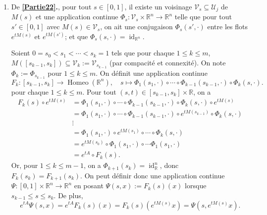 \documentclass[french]{article}
\theoremstyle{definition}
\newcommand{\Rbb}{\mathbb{R}}
\newcommand{\Ucal}{\mathcal{U}}
\newcommand{\Vcal}{\mathcal{V}}
\newcommand{\id}{\operatorname{id}}
\newcommand{\Homeo}{\operatorname{Homeo}}
\newcommand{\diag}{\operatorname{diag}}
\begin{document}
\begin{enumerate}
\begin{enumerate}
        \item De m\^eme, on peut trouver les chemins $c_k$ reliant $C_k$ \`a $\diag[-1,\ldots,-1]$ ($1 \le k \le u$) tel que les valeurs propres de $c_k(t)$ sont n\'egatives pour tout $t \in [0,1]$; et les chemins $d_k$ reliant $D_k$ \`a $\diag[-1,\ldots,-1]$ ($1 \le k \le v$) tel que les valeurs propres de $d_k(t)$ sont de partie r\'eelle n\'egative pour tout $t \in [0,1]$.
        \end{enumerate}
        
        Ainsi, on a un chemin
            $$h:=\diag[a_1,\ldots,a_r,b_1,\ldots,b_s,c_1,\ldots,c_u,d_1,\ldots,d_v] : [0,1] \to \Ucal_j$$
        reliant $h(0) = H$ \`a $h(1) = I_j$. En cons\'equence, on a une chemin
            $$\forall t \in [0,1], \qquad m(t):=p(t)h(t)p(t)^{-1} \in \Ucal_j$$
        reliant $m(0) = PHP^{-1} = M$ \`a $m(1) = I_j$ dans $\Ucal_j$. Donc $\Ucal_j$ est connexe par arcs.
        
        \item \label{Partie24} De {\bf \ref{Partie22}.}, pour tout $s \in [0,1]$, il existe un voisinage $\Vcal_s \subseteq \Ucal_j$ de $M(s)$ et une application continue $\Phi_s: \Vcal_s \times \Rbb^n \to \Rbb^n$ telle que pour tout $s' \in [0,1]$ avec $M(s) \in \Vcal_s$, on ait une conjugaison $\Phi_s(s',\cdot)$ entre les flots $e^{tM(s)}$ et $e^{tM(s')}$; et que $\Phi_s(s,\cdot) = \id_{\Rbb^n}$.
        
        Soient $0 = s_0 < s_1 < \cdots < s_k = 1$ tels que pour chaque $1 \le k \le m$, $M([s_{k-1},s_k]) \subseteq \Vcal_k:=\Vcal_{s_{k-1}}$ (par compacit\'e et connexit\'e). On note $\Phi_k:=\Phi_{s_{k-1}}$ pour $1 \le k \le m$. On d\'efinit une application continue 
            $$F_k: [s_{k-1},s_k] \to \Homeo(\Rbb^n), \quad s \mapsto \Phi_1(s_1,\cdot) \circ \cdots \circ \Phi_{k-1}(s_{k-1},\cdot) \circ  \Phi_k(s,\cdot).$$
        pour chaque $1 \le k \le m$. Pour tout $(s,t) \in [s_{k-1}, s_k] \times \Rbb$, on a
            \begin{align*}
                F_k(s) \circ e^{tM(s)} & = \Phi_1(s_1,\cdot) \circ \cdots \circ \Phi_{k-1}(s_{k-1},\cdot) \circ  \Phi_k(s,\cdot) \circ e^{tM(s)} \\
                & = \Phi_1(s_1,\cdot) \circ \cdots \circ \Phi_{k-1}(s_{k-1},\cdot) \circ e^{tM(s_{k-1})} \circ  \Phi_k(s,\cdot)\\
                & \vdots \\
                & = \Phi_1(s_1,\cdot) \circ e^{tM(s_1)} \circ \cdots \circ  \Phi_k(s,\cdot)\\
                & = e^{tM(s_0)} \circ \Phi_1(s_1,\cdot) \circ \cdots \Phi_1(s_1,\cdot)\\
                & = e^{tA} \circ F_k(s).
            \end{align*}
        Or, pour $1 \le k \le m-1$, on a $\Phi_{k+1}(s_k) = \id_{\Rbb}^n$, donc $F_k(s_k) = F_{k+1}(s_k)$. On peut d\'efinir donc une application continue $\Psi:[0,1] \times \Rbb^n \to \Rbb^n$ en posant $\Psi(s,x):=F_k(s)(x)$ lorsque $s_{k-1} \le s \le s_k$. De plus,
            $$e^{tA}\Psi(s,x) = e^{tA}F_k(s)(x) = F_k(s)(e^{tM(s)}x) = \Psi(s,e^{tM(s)}x).$$
\end{enumerate}
\end{document}
